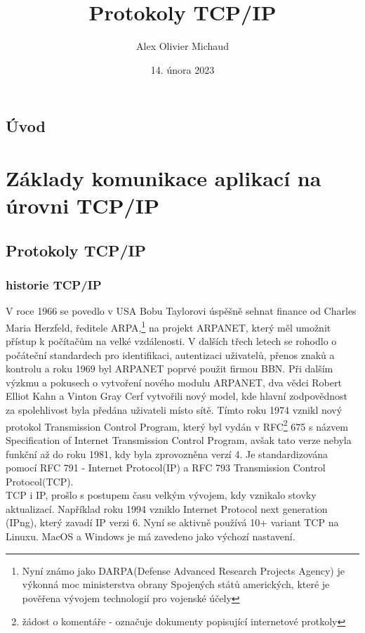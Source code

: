 \documentclass[12pt]{report}			%
\author{Alex Olivier Michaud}
\title{Protokoly TCP/IP}
\date{14. února 2023}
\begin{document}
	\mytitlepage						%
	
	
	\abstrakt{
		\lipsum[1]						%
	}{
		\lipsum[1]						%
	}
	
	\podekovani{
		\lipsum[2]						%
	}
	
   {\tableofcontents\newpage}			%
	
\addtocounter{page}{1}		%
	\chapter*{Úvod}
	
		\lipsum[1]	
	
	
	\part{Základy komunikace aplikací na úrovni TCP/IP}
	
		\chapter{Protokoly TCP/IP}
			
			\section{historie TCP/IP}
				V roce 1966 se povedlo v USA Bobu Taylorovi úspěšně sehnat finance od Charles Maria Herzfeld, ředitele ARPA,\footnote{Nyní známo jako DARPA(Defense Advanced Research Projects Agency) je výkonná moc ministerstva obrany Spojených států amerických, které je pověřena vývojem technologií pro vojenské účely} na projekt ARPANET, který měl umožnit přístup k počítačům na velké vzdálenosti. V dalších třech letech se rohodlo o počáteční standardech pro identifikaci, autentizaci uživatelů, přenos znaků a kontrolu a roku 1969 byl ARPANET poprvé použit firmou BBN. 
Při dalším výzkmu a pokusech o vytvoření nového modulu ARPANET, dva vědci Robert Elliot Kahn a Vinton Gray Cerf vytvořili nový model, kde hlavní zodpovědnost za spolehlivost byla předána uživateli místo sítě. Tímto roku 1974 vznikl nový protokol Transmission Control Program, který byl vydán v RFC\footnote{žádost o komentáře - označuje dokumenty popisující internetové protkoly} 675 s názvem Specification of Internet Transmission Control Program, avšak tato verze nebyla funkční až do roku 1981, kdy byla zprovozněna verzí 4. Je standardizována pomocí RFC 791 - Internet Protocol(IP) a RFC 793 Transmission Control Protocol(TCP). 
\\
TCP i IP, prošlo s postupem času velkým vývojem, kdy vznikalo stovky aktualizací. Například roku 1994 vzniklo Internet Protocol next generation (IPng), který zavadí IP verzi 6. Nyní se aktivně používá 10+ variant TCP na Linuxu. MacOS a Windows je má zavedeno jako výchozí nastavení. 
\cite{History_3} \cite{ARPNET} \cite{History_2} \cite{History} \cite{Rules} \cite{IP} \cite{TCP}  
\end{document}
